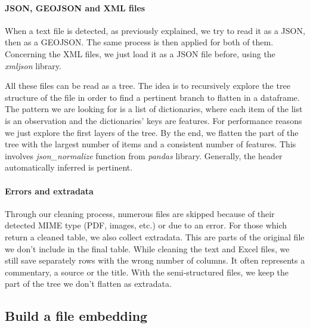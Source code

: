 \documentclass[a4paper]{article}
\begin{document}
	
	\paragraph{JSON, GEOJSON and XML files}
	
	When a text file is detected, as previously explained, we try to read it as a JSON, then as a GEOJSON. The same process is then applied for both of them. Concerning the XML files, we just load it as a JSON file before, using the \emph{xmljson} library. 
	
	All these files can be read as a tree. The idea is to recursively explore the tree structure of the file in order to find a pertinent branch to flatten in a dataframe. The pattern we are looking for is a list of dictionaries, where each item of the list is an observation and the dictionaries' keys are features. For performance reasons we just explore the first layers of the tree. By the end, we flatten the part of the tree with the largest number of items and a consistent number of features. This involves \emph{json\_normalize} function from \emph{pandas} library. Generally, the header automatically inferred is pertinent.
	
	
	\paragraph{Errors and extradata}
	
	Through our cleaning process, numerous files are skipped because of their detected MIME type (PDF, images, etc.) or due to an error. For those which return a cleaned table, we also collect extradata. This are parts of the original file we don't include in the final table. While cleaning the text and Excel files, we still save separately rows with the wrong number of columns. It often represents a commentary, a source or the title. With the semi-structured files, we keep the part of the tree we don't flatten as extradata.
	
	\subsection{Build a file embedding}
	
\end{document}
